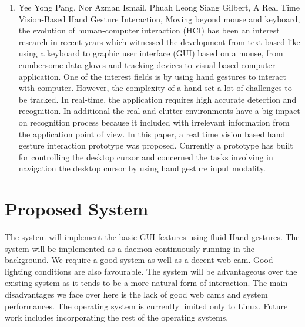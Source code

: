 \documentclass[11pt]{report}
\begin{document}
\begin{enumerate}
    \item Yee Yong Pang, Nor Azman Ismail, Phuah Leong Siang Gilbert, A Real Time Vision-Based Hand Gesture Interaction, Moving  beyond  mouse  and  keyboard,  the  evolution of human-computer interaction (HCI) has been an interest research in recent years which witnessed the development from text-based  like  using  a  keyboard  to  graphic  user  interface (GUI)  based  on  a  mouse,  from  cumbersome  data  gloves  and tracking devices to visual-based computer application. One of the  interest  fields  is  by  using  hand  gestures  to  interact  with computer.  However,  the  complexity  of  a  hand  set  a  lot  of challenges to be tracked. In real-time, the application requires high accurate detection and recognition. In additional the real and  clutter  environments  have  a  big  impact  on  recognition process  because  it  included  with  irrelevant  information  from the   application   point   of   view.   In   this   paper,   a   real   time vision based hand gesture interaction prototype was proposed. Currently  a  prototype  has  built  for  controlling  the  desktop cursor  and  concerned  the  tasks  involving  in  navigation  the desktop  cursor  by  using  hand  gesture  input  modality.\cite{10}

\end{enumerate}

\section{Proposed System}


The system will implement the basic GUI features using fluid Hand gestures. The system will be implemented as a daemon continuously running in the background. We require a good system as well as a decent web cam. Good lighting conditions are also favourable.
The system will be advantageous over the existing system as it tends to be a more natural form of interaction. 
The main disadvantages we face over here is the lack of good web cams and system performances. The operating system is currently limited only to Linux. Future work includes incorporating the rest of the operating systems. 
\end{document}
